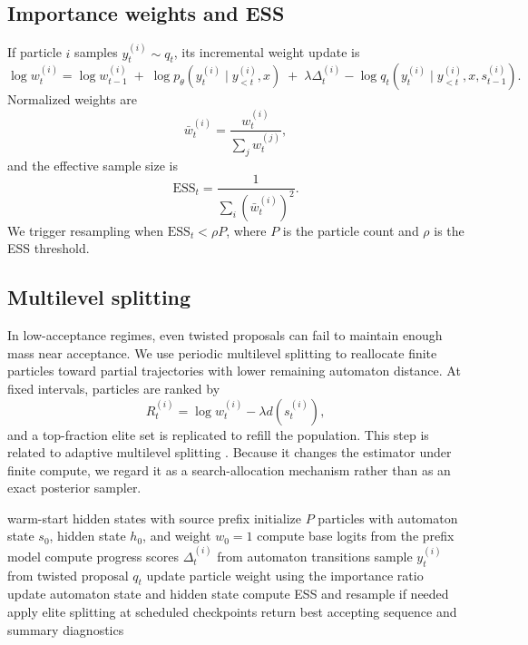 \documentclass[11pt]{article}
\begin{document}
\subsection{Importance weights and ESS}
If particle $i$ samples $y_t^{(i)} \sim q_t$, its incremental weight update is
\[
\log w_t^{(i)} =
\log w_{t-1}^{(i)}
\;+\;
\log p_\theta\!\left(y_t^{(i)}\mid y_{<t}^{(i)},x\right)
\;+\;
\lambda \Delta_t^{(i)}
\!-\!
\log q_t\!\left(y_t^{(i)}\mid y_{<t}^{(i)},x,s_{t-1}^{(i)}\right).
\]
Normalized weights are
\[
\bar{w}_t^{(i)} = \frac{w_t^{(i)}}{\sum_j w_t^{(j)}},
\]
and the effective sample size is
\[
\mathrm{ESS}_t = \frac{1}{\sum_i (\bar{w}_t^{(i)})^2}.
\]
We trigger resampling when $\mathrm{ESS}_t < \rho P$, where $P$ is the particle count and $\rho$ is the ESS threshold.

\subsection{Multilevel splitting}
In low-acceptance regimes, even twisted proposals can fail to maintain enough mass near acceptance. We use periodic multilevel splitting to reallocate finite particles toward partial trajectories with lower remaining automaton distance. At fixed intervals, particles are ranked by
\[
R_t^{(i)} = \log w_t^{(i)} - \lambda d(s_t^{(i)}),
\]
and a top-fraction elite set is replicated to refill the population. This step is related to adaptive multilevel splitting \citep{cerou2007adaptive}. Because it changes the estimator under finite compute, we regard it as a search-allocation mechanism rather than as an exact posterior sampler.

\begin{algorithm}[H]
\caption{Twisted SMC bridge.}
\label{alg:smc-bridge}
\begin{algorithmic}[1]
\State warm-start hidden states with source prefix
\State initialize $P$ particles with automaton state $s_0$, hidden state $h_0$, and weight $w_0=1$
    \State compute base logits from the prefix model
    \State compute progress scores $\Delta_t^{(i)}$ from automaton transitions
    \State sample $y_t^{(i)}$ from twisted proposal $q_t$
    \State update particle weight using the importance ratio
    \State update automaton state and hidden state
  \EndFor
  \State compute ESS and resample if needed
  \State apply elite splitting at scheduled checkpoints
\EndFor
\State return best accepting sequence and summary diagnostics
\end{algorithmic}
\end{algorithm}
\FloatBarrier
\end{document}

